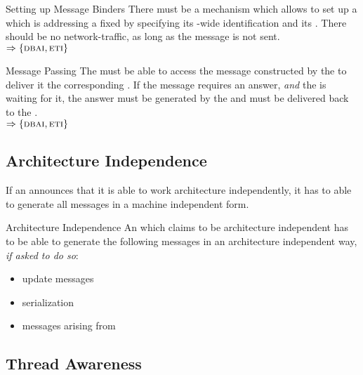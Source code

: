 \documentclass[a4paper, 12pt]{book}
\newcommand{\INTERFACE}[1]{$\Rightarrow\left\{#1\right\}$}
\begin{document}
\begin{requirement*}{Setting up Message Binders}
  There must be a mechanism which allows to set up a  which
  is addressing a fixed  by specifying its
  -wide identification and its .
  There should be no network-traffic, as long as the message is not sent.\\
  \INTERFACE{\DBAI,\ETI}
\end{requirement*}

\begin{requirement*}{Message Passing}
  The \SYNEIGHT must be able to access the message constructed by the
   to deliver it the corresponding
  . If the message requires an answer,
  \emph{and} the  is waiting for it, the answer must be generated
  by the  and must
  be delivered back to the .\\
  \INTERFACE{\DBAI,\ETI}
\end{requirement*}


\subsection{Architecture Independence}

If an  announces that it is able to work
architecture independently, it has to able to generate all messages in a
machine independent form. 

\begin{samepage}\begin{requirement*}{Architecture Independence}
  An  which claims to be architecture
  independent has to be able to generate the following messages in an
  architecture independent way, \emph{if asked to do so}:
  \begin{itemize}
  \item update messages
  \item serialization
  \item messages arising from 
  \end{itemize}
\end{requirement*}\end{samepage}



\subsection{Thread Awareness}
\end{document}
